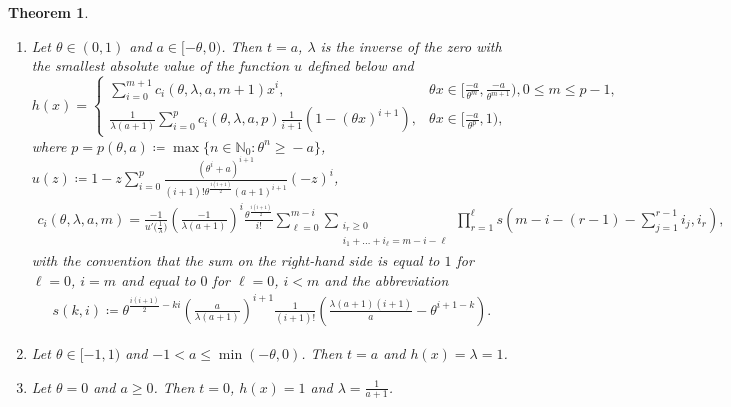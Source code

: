 \documentclass[12pt]{article}
\newcommand{\N}{\mathbb{N}} %
\newcommand{\1}{\mathds{1}}
\theoremstyle{definition}
\theoremstyle{plain}
\newtheorem{Theorem}[definition]{Theorem}
\theoremstyle{remark}
\begin{document}
\begin{Theorem}
\begin{enumerate}[label={\rm (\Alph{*})},ref={\rm (\Alph{*})}]
     $$h(x)=\begin{cases}E\left(\theta,\frac{-\theta x}{\lambda(a+1)}\right),&~-a \leq \theta x\leq  \frac{-a}{\theta},
     \\\frac{(1-\theta x)}{\lambda(a+1)}E\left(\theta,\frac{a}{\lambda(a+1)}\right),&~~\frac{-a}{\theta}< \theta x< 1.\end{cases}$$
    \setcounter{enumi}{14}
     \item Let $\theta\in(0,1)$ and $a\in[-\theta,0)$. Then $t=a$, $\lambda$ is the inverse of the zero with the smallest absolute value of the function $u$ defined below and
     $$h(x)=\begin{cases}
           \sum_{i=0}^{m+1}c_i(\theta,\lambda,a,m+1)x^i,&\!\!\!\theta x\in \bigg[\frac{-a}{\theta^m},\frac{-a}{\theta^{m+1}}\bigg),0\!\le \!m\!\le\! p\!-\!1,
            \\ \frac{1}{\lambda(a+1)}\sum_{i=0}^{p}c_i(\theta,\lambda,a,p)\frac{1}{i+1}\left(1-(\theta x)^{i+1}\right),&\!\!\!\theta x\in \bigg[\frac{-a}{\theta^p},1\bigg),
        \end{cases}$$
        where $p=p(\theta,a)\!\coloneqq\!\max\{n\in\N_0:\theta^n\geq\!-a\}$, $u(z)\coloneqq 1-z\sum_{i=0}^p\frac{(\theta^i+a)^{i+1}}{(i+1)!\theta^{\frac{i(i+1)}{2}}(a+1)^{i+1}}(-z)^i$,
                \begin{align} \label{eqn:orange:defnciwithlambda}
             c_i(\theta,\lambda,a,m)\!=\!\frac{-1}{u'\big(\frac{1}{\lambda}\big)}\!\left(\frac{-1}{\lambda(a\!+\!1)}\right)^i\!\frac{\theta^\frac{i(i+1)}{2}}{i!}\sum_{{\ell}=0}^{m-i}\!\!\!\!\!\sum_{\substack{i_r\ge 0\\i_1+\dots +i_{\ell}= m\!-i\!-{\ell}}}\!\!\!\!\!\prod_{r=1}^{\ell}s(m\!-\!i\!-\!(r\!-\!1)\!-\!\sum_{j=1}^{r-1}i_j,i_r),
        \end{align} 
        with the convention that the sum on the right-hand side is equal to $1$ for ${\ell}=0$, $i=m$ and equal to $0$ for ${\ell}=0$, $i<m$ and the abbreviation
        \begin{align}\label{def_orange_s}
            s(k,i)\coloneqq \theta^{\frac{i(i+1)}{2}-ki}\left(\frac{a}{\lambda(a+1)}\right)^{i+1}\frac{1}{(i+1)!}\left(\frac{\lambda(a+1)(i+1)}{a}-\theta^{i+1-k}\right).
        \end{align}
\setcounter{enumi}{22}
     \item  Let $\theta\in[-1,1)$ and $-1<a\leq\min(-\theta,0)$. Then $t=a$ and $h(x)=\lambda=1$.
\setcounter{enumi}{19}
    \item Let $\theta=0$ and $a\ge 0$. Then $t=0$, $h(x)=1$ and $\lambda=\frac{1}{a+1}$.
\end{enumerate}
\end{Theorem}
\end{document}
